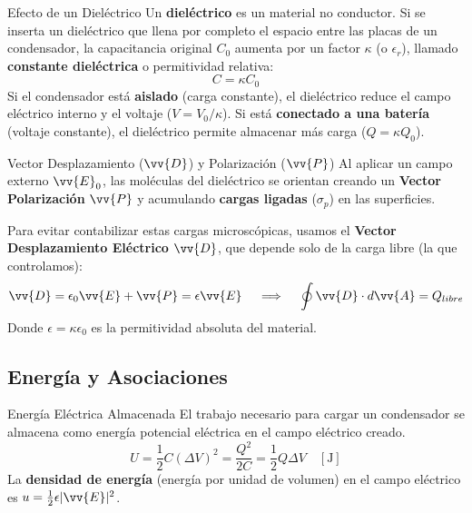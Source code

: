 \documentclass[11pt]{article}
\begin{document}
\begin{boxTeoria}{Efecto de un Dieléctrico}
    Un \textbf{dieléctrico} es un material no conductor. Si se inserta un dieléctrico que llena por completo el espacio entre las placas de un condensador, la capacitancia original $C_0$ aumenta por un factor $\kappa$ (o $\epsilon_r$), llamado \textbf{constante dieléctrica} o permitividad relativa:
    \begin{equation*}
        C = \kappa C_0
    \end{equation*}
    Si el condensador está \textbf{aislado} (carga constante), el dieléctrico reduce el campo eléctrico interno y el voltaje ($V = V_0/\kappa$). Si está \textbf{conectado a una batería} (voltaje constante), el dieléctrico permite almacenar más carga ($Q = \kappa Q_0$).
\end{boxTeoria}

\begin{boxTeoria}{Vector Desplazamiento ($\vv{D}$) y Polarización ($\vv{P}$)}
    Al aplicar un campo externo $\vv{E}_0$, las moléculas del dieléctrico se orientan creando un \textbf{Vector Polarización} $\vv{P}$ y acumulando \textbf{cargas ligadas} ($\sigma_p$) en las superficies.

    Para evitar contabilizar estas cargas microscópicas, usamos el \textbf{Vector Desplazamiento Eléctrico} $\vv{D}$, que depende solo de la carga libre (la que controlamos):
    \begin{equation*}
        \vv{D} = \epsilon_0 \vv{E} + \vv{P} = \epsilon \vv{E} \quad \implies \quad \oint \vv{D} \cdot d\vv{A} = Q_{libre}
    \end{equation*}
    Donde $\epsilon = \kappa \epsilon_0$ es la permitividad absoluta del material.
\end{boxTeoria}

\subsection*{Energía y Asociaciones}

\begin{boxTeoria}{Energía Eléctrica Almacenada}
    El trabajo necesario para cargar un condensador se almacena como energía potencial eléctrica en el campo eléctrico creado.
    \begin{equation*}
        U = \frac{1}{2} C (\Delta V)^2 = \frac{Q^2}{2C} = \frac{1}{2} Q \Delta V \quad [\unit{\J}]
    \end{equation*}
    La \textbf{densidad de energía} (energía por unidad de volumen) en el campo eléctrico es $u = \frac{1}{2} \epsilon |\vv{E}|^2$.
\end{boxTeoria}
\end{document}
